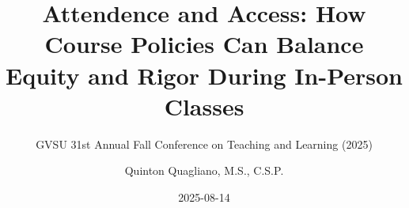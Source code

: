 \documentclass[
      american,
      12pt,
      letterpaper,
    ]{article}
\title{Attendence and Access: How Course Policies Can Balance Equity and
Rigor During In-Person Classes}
\subtitle{GVSU 31st Annual Fall Conference on Teaching and Learning
(2025)}
\author{Quinton Quagliano, M.S., C.S.P.}
\date{2025-08-14}
\begin{document}


\begin{titlepage}


\newcommand{\titlepagepagealign}{
	\ifthenelse{\equal{center}{right}}{\raggedleft}{}
	\ifthenelse{\equal{center}{center}}{\centering}{}
	\ifthenelse{\equal{center}{left}}{\raggedright}{}
}


\newcommand{\titleandsubtitle}{
{{\huge{\bfseries{\nohyphens{Attendence and Access: How Course Policies
Can Balance Equity and Rigor During In-Person Classes}}}}\par
}%

\vspace{\betweentitlesubtitle}
{
{\Large{\nohyphens{GVSU 31st Annual Fall Conference on Teaching and
Learning (2025)}}}\par
}}
\newcommand{\titlepagetitleblock}{
\newcommand{\HRule}{\rule{\linewidth}{0.5mm}} 

\HRule\\[0.4cm]

\titleandsubtitle

\HRule\\
}
\newcommand{\authorstyle}[1]{{\small{#1}}}

\newcommand{\affiliationstyle}[1]{{\small{#1}}}

\newcommand{\titlepageauthorblock}{
\newlength{\miniA}
\setlength{\miniA}{0pt}
\newlength{\namelen}
\settowidth{\namelen}{Quinton Quagliano, M.S.,
C.S.P.}\setlength{\miniA}{\maxof{\miniA}{\namelen}}
\setlength{\miniA}{\miniA+0.05\textwidth}
\newlength{\miniB}
\setlength{\miniB}{0.99\textwidth - \miniA}
\begin{minipage}{\miniA}
\begin{flushleft}
{\authorstyle{Quinton Quagliano, M.S., C.S.P.}}
\end{flushleft}
\end{minipage}
\begin{minipage}{\miniB}
\begin{flushright}
{\affiliationstyle{\\}}
\end{flushright}
\end{minipage}}

\newcommand{\titlepageaffiliationblock}{}
\newcommand{\headerstyled}{%
{\textsc{\LARGE{}}}
}
\newcommand{\footerstyled}{%
{}
}
\newcommand{\datestyled}{%
{\large{2025-08-14}}
}



\end{titlepage}
\end{document}
